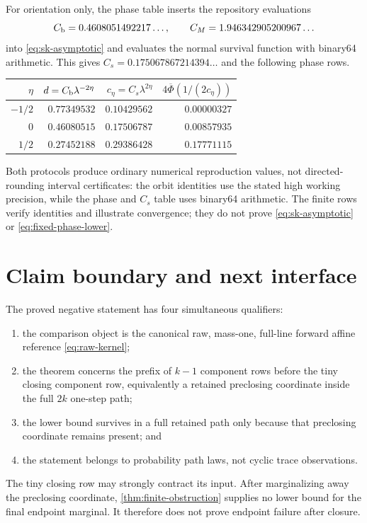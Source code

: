 \documentclass[11pt]{article}
\theoremstyle{definition}
\theoremstyle{remark}
\newcommand{\Phibar}{\overline\Phi}
\begin{document}
For orientation only, the phase table inserts the repository evaluations
\[
 C_{\rm b}=0.4608051492217\ldots,
 \qquad C_M=1.946342905200967\ldots
\]
into \eqref{eq:sk-asymptotic} and evaluates the normal survival function
with binary64 arithmetic.  This gives
$C_s=0.175067867214394\ldots$ and the following phase rows.
\begin{center}\small
\begin{tabular}{rrrr}
\toprule
$\eta$ & $d=C_{\rm b}\lambda^{-2\eta}$
& $c_\eta=C_s\lambda^{2\eta}$
& $4\Phibar(1/(2c_\eta))$\\
\midrule
$-1/2$ & $0.77349532$ & $0.10429562$ & $0.00000327$\\
$0$    & $0.46080515$ & $0.17506787$ & $0.00857935$\\
$1/2$  & $0.27452188$ & $0.29386428$ & $0.17771115$\\
\bottomrule
\end{tabular}
\end{center}
Both protocols produce ordinary numerical reproduction values, not
directed-rounding interval certificates: the orbit identities use the
stated high working precision, while the phase and $C_s$ table uses
binary64 arithmetic.  The finite rows verify identities and illustrate
convergence; they do not prove \eqref{eq:sk-asymptotic} or
\eqref{eq:fixed-phase-lower}.

\section{Claim boundary and next interface}

The proved negative statement has four simultaneous qualifiers:
\begin{enumerate}
\item the comparison object is the canonical raw, mass-one, full-line
      forward affine reference \eqref{eq:raw-kernel};
\item the theorem concerns the prefix of $k-1$ component rows before the
      tiny closing component row, equivalently a retained preclosing
      coordinate inside the full $2k$ one-step path;
\item the lower bound survives in a full retained path only because that
      preclosing coordinate remains present; and
\item the statement belongs to probability path laws, not cyclic trace
      observations.
\end{enumerate}

The tiny closing row may strongly contract its input.  After marginalizing
away the preclosing coordinate, \cref{thm:finite-obstruction} supplies no
lower bound for the final endpoint marginal.  It therefore does not prove
endpoint failure after closure.
\end{document}
